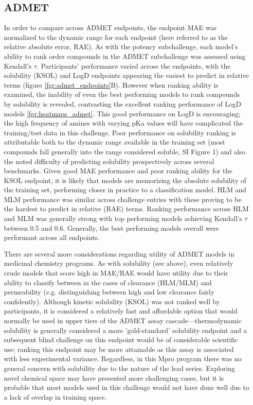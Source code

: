 \documentclass[journal=jcim,manuscript=article]{achemso}
\begin{document}
{\subsection{ADMET}
In order to compare across ADMET endpoints, the endpoint MAE was normalized to the dynamic range for each endpoint (here referred to as the relative absolute error, RAE). As with the potency subchallenge, each model's ability to rank order compounds in the ADMET subchallenge was assessed using Kendall's $\tau$. Participants' performance varied across the endpoints, with the solubility (KSOL) and LogD endpoints appearing the easiest to predict in relative terms (figure \ref{fgr:admet_endpoints}B). However when ranking ability is examined, the inability of even the best performing models to rank compounds by solubility is revealed, contrasting the excellent ranking performance of LogD models \ref{fgr:heatmaps_admet}. This good performance on LogD is encouraging; the high frequency of amines with varying pKa values will have complicated the training/test data in this challenge. Poor performance on solubility ranking is attributable both to the dynamic range available in the training set (most compounds fall generally into the range considered soluble, SI Figure 1) and also the noted difficulty of predicting solubility prospectively across several benchmarks\cite{llompart_solubility_2024}. Given good MAE performance and poor ranking ability for the KSOL endpoint, it is likely that models are memorizing the absolute solubility of the training set, performing closer in practice to a classification model. HLM and MLM performance was similar across challenge entries with these proving to be the hardest to predict in relative (RAE) terms. Ranking performance across HLM and MLM was generally strong with top performing models achieving Kendall's $\tau$ between 0.5 and 0.6. Generally, the best performing models overall were performant across all endpoints.

There are several more considerations regarding utility of ADMET models in medicinal chemistry programs. As with solubility (see above), even relatively crude models that score high in MAE/RAE would have utility due to their ability to classify between in the cases of clearance (HLM/MLM) and permeability (e.g. distinguishing between high and low clearance fairly confidently). Although kinetic solubility (KSOL) was not ranked well by participants, it is considered a relatively fast and affordable option that would normally be used in upper tiers of the ADMET assay cascade---thermodynamic solubility is generally considered a more 'gold-standard' solubility endpoint and a subsequent blind challenge on this endpoint would be of considerable scientific use; ranking this endpoint may be more attainable as this assay is associated with less experimental variance.\cite{llompart_minoletti_baybekov_horvath_marcou_varnek_2024} Regardless, in this Mpro program there was no general concern with solubility due to the nature of the lead series. Exploring novel chemical space may have presented more challenging cases, but it is probable that most models used in this challenge would not have done well due to a lack of overlap in training space.

}
\end{document}
